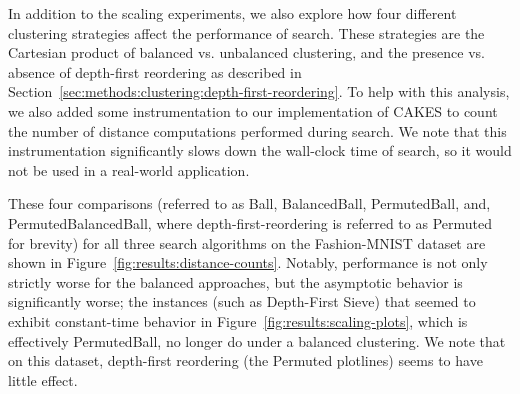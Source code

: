 In addition to the scaling experiments, we also explore how four different clustering strategies affect the performance of search.
These strategies are the Cartesian product of balanced vs. unbalanced clustering, and the presence vs. absence of depth-first reordering as described in Section~\ref{sec:methods:clustering:depth-first-reordering}.
To help with this analysis, we also added some instrumentation to our implementation of CAKES to count the number of distance computations performed during search.
We note that this instrumentation significantly slows down the wall-clock time of search, so it would not be used in a real-world application.

These four comparisons (referred to as Ball, BalancedBall, PermutedBall, and, PermutedBalancedBall, where depth-first-reordering is referred to as Permuted for brevity) for all three search algorithms on the Fashion-MNIST dataset are shown in Figure~\ref{fig:results:distance-counts}.
Notably, performance is not only strictly worse for the balanced approaches, but the asymptotic behavior is significantly worse;
the instances (such as Depth-First Sieve) that seemed to exhibit constant-time behavior in Figure~\ref{fig:results:scaling-plots}, which is effectively PermutedBall, no longer do under a balanced clustering.
We note that on this dataset, depth-first reordering (the Permuted plotlines) seems to have little effect.


